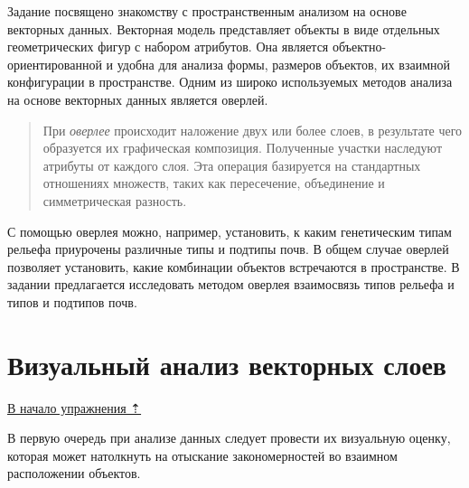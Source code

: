 \documentclass[]{book}
\theoremstyle{definition}
\theoremstyle{definition}
\theoremstyle{definition}
\theoremstyle{remark}
\begin{document}
Задание посвящено знакомству с пространственным анализом на основе
векторных данных. Векторная модель представляет объекты в виде отдельных
геометрических фигур с набором атрибутов. Она является
объектно-ориентированной и удобна для анализа формы, размеров объектов,
их взаимной конфигурации в пространстве. Одним из широко используемых
методов анализа на основе векторных данных является оверлей.

\begin{quote}
При \emph{оверлее} происходит наложение двух или более слоев, в
результате чего образуется их графическая композиция. Полученные участки
наследуют атрибуты от каждого слоя. Эта операция базируется на
стандартных отношениях множеств, таких как пересечение, объединение и
симметрическая разность.
\end{quote}

С помощью оверлея можно, например, установить, к каким генетическим
типам рельефа приурочены различные типы и подтипы почв. В общем случае
оверлей позволяет установить, какие комбинации объектов встречаются в
пространстве. В задании предлагается исследовать методом оверлея
взаимосвязь типов рельефа и типов и подтипов почв.

\hypertarget{overlay-vectors}{%
\section{Визуальный анализ векторных слоев}\label{overlay-vectors}}

\protect\hyperlink{overlay}{В начало упражнения ⇡}

В первую очередь при анализе данных следует провести их визуальную
оценку, которая может натолкнуть на отыскание закономерностей во
взаимном расположении объектов.
\end{document}
